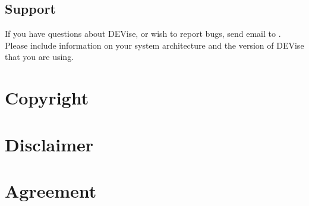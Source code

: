 \subsection{Support}

If you have questions about DEVise, or wish to report bugs, send email to
.  Please include information on your system
architecture and the version of DEVise that you are using.


\newpage 
\section*{Copyright}



\section*{Disclaimer}



\newpage
\section*{Agreement}





